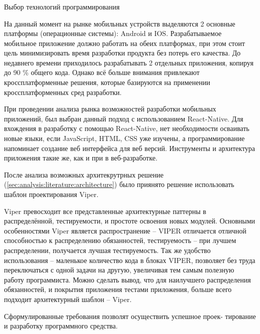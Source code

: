 \subsubsection{} Выбор технологий программирования
\label{sec:analysis:specification:language}

На данный момент на рынке мобильных устройств выделяются 2 основные платформы (операционные системы): Android и IOS. Разрабатываемое мобильное приложение должно работать на обеих платформах, при этом стоит цель минимизировать время разработки продукта без потерь его качества. До недавнего времени приходилось разрабатывать 2 отдельных приложения, копируя до 90 \% общего кода. Однако всё больше внимания привлекают кроссплатформенные решения, которые базируются на применении кроссплатформенных сред разработки.

При проведении анализа рынка возможностей разработки мобильных приложений, был выбран данный подход с использованием React-Native.
Для вхождения в разработку с помощью React-Native, нет необходимости осваивать новые языки, если JavaScript, HTML, CSS уже изучены, а программирование напоминает
создание веб интерфейса для веб версий. Инструменты и архитектура приложения такие же, как и при в веб-разработке. 

После анализа возможных архитекрутрных решение (\ref{sec:analysis:literature:architecture}) было приянято решение использовать шаблон проектирования Viper.

Viper превосходит все представленные архитектурные паттерны в
распределённой, тестируемости, и простоте освоения новых модулей.
Основными особенностями Viper является распространение – VIPER
отличается отличной способностью к распределению обязанностей,
тестируемость – при лучшем распределении, получается лучшая тестируемость.
Так же удобство использования – маленькое количество кода в блоках VIPER,
позволяет без труда переключаться с одной задачи на другую, увеличивая тем
самым полезную работу программиста.
Можно сделать вывод, что для наилучшего распределения обязанностей,
и покрытия приложения тестами приложения, больше всего подходит
архитектурный шаблон -- Viper. 

Сформулированные требования позволят осуществить успешное проек- тирование и разработку программного средства.

